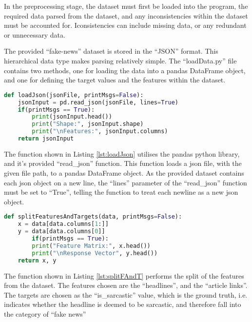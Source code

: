 In the preprocessing stage, the dataset must first be loaded into the program, the
required data parsed from the dataset, and any inconsistencies within the
dataset must be accounted for. Iconsistencies can include missing data, or any
redundant or unnecessary data.

\par The provided ``fake-news'' dataset is stored in the ``JSON'' format. This
hierarchical data type makes parsing relatively simple. The ``loadData.py''
file contains two methods, one for loading the data into a pandas DataFrame object,
and one for defining the target values and the features within the dataset.

\begin{lstlisting}[language=Python, caption={``loadJson'' function},
label={lst:loadJson}]
def loadJson(jsonFile, printMsgs=False):
	jsonInput = pd.read_json(jsonFile, lines=True)
	if(printMsgs == True):
		print(jsonInput.head())
		print("Shape:", jsonInput.shape)
		print("\nFeatures:", jsonInput.columns)
	return jsonInput
\end{lstlisting}

The function shown in Listing \ref{lst:loadJson} utilises the pandas python
library, and it's provided ``read\_json'' function. This function loads a json
file, with the given file path, to a pandas DataFrame object. As the provided
dataset contains each json object on a new line, the ``lines'' parameter of the
``read\_json'' function must be set to ``True'', telling the function to treat
each newline as a new json object.

\begin{lstlisting}[language=Python, caption={``splitFeaturesAndTargets''
function}, label={lst:splitFAndT}]
def splitFeaturesAndTargets(data, printMsgs=False):
	x = data[data.columns[1:]]
	y = data[data.columns[0]]
    	if(printMsgs == True):
		print("Feature Matrix:", x.head())
		print("\nResponse Vector", y.head())
	return x, y
\end{lstlisting}

The function shown in Listing \ref{lst:splitFAndT} performs the split of the
features from the dataset. The features chosen are the ``headlines'', and the
``article links''. The targets are chosen as the ``is\_sarcastic'' value, which is
the ground truth, i.e. indicates whether the headline is deemed to be sarcastic,
and therefore fall into the category of ``fake news''

